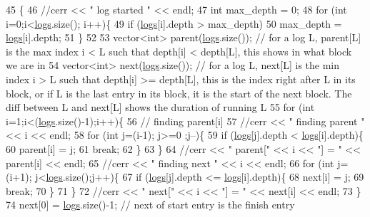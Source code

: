 \begin{DoxyCode}
45                 \{
46   \textcolor{comment}{//cerr << " log started " << endl;}
47   \textcolor{keywordtype}{int} max\_depth = 0;
48   \textcolor{keywordflow}{for} (\textcolor{keywordtype}{int} i=0;i<\hyperlink{classlogger_a46e89697a97bc41a90ec78763bfe4d39}{logs}.size(); i++)\{
49     \textcolor{keywordflow}{if} (\hyperlink{classlogger_a46e89697a97bc41a90ec78763bfe4d39}{logs}[i].depth > max\_depth)
50       max\_depth = \hyperlink{classlogger_a46e89697a97bc41a90ec78763bfe4d39}{logs}[i].depth;
51   \}
52 
53   vector<int> parent(\hyperlink{classlogger_a46e89697a97bc41a90ec78763bfe4d39}{logs}.size()); \textcolor{comment}{// for a log L, parent[L] is the max index i < L such that depth[i]
       < depth[L], this shows in what block we are in}
54   vector<int> next(\hyperlink{classlogger_a46e89697a97bc41a90ec78763bfe4d39}{logs}.size()); \textcolor{comment}{// for a log L, next[L] is the min index i > L such that depth[i] >=
       depth[L], this is the index right after L in its block, or if L is the last entry in its block, it is the
       start of the next block. The diff between L and next[L] shows the duration of running L}
55   \textcolor{keywordflow}{for} (\textcolor{keywordtype}{int} i=1;i<(\hyperlink{classlogger_a46e89697a97bc41a90ec78763bfe4d39}{logs}.size()-1);i++)\{
56     \textcolor{comment}{// finding parent[i]}
57     \textcolor{comment}{//cerr << " finding parent " << i << endl;}
58     \textcolor{keywordflow}{for} (\textcolor{keywordtype}{int} j=(i-1); j>=0 ;j--)\{
59       \textcolor{keywordflow}{if} (\hyperlink{classlogger_a46e89697a97bc41a90ec78763bfe4d39}{logs}[j].depth < \hyperlink{classlogger_a46e89697a97bc41a90ec78763bfe4d39}{logs}[i].depth)\{
60         parent[i] = j;
61         \textcolor{keywordflow}{break};
62       \}
63     \}
64     \textcolor{comment}{//cerr << " parent[" << i << "] = " << parent[i] << endl;}
65     \textcolor{comment}{//cerr << " finding next " << i << endl;}
66     \textcolor{keywordflow}{for} (\textcolor{keywordtype}{int} j=(i+1); j<\hyperlink{classlogger_a46e89697a97bc41a90ec78763bfe4d39}{logs}.size();j++)\{
67       \textcolor{keywordflow}{if} (\hyperlink{classlogger_a46e89697a97bc41a90ec78763bfe4d39}{logs}[j].depth <= \hyperlink{classlogger_a46e89697a97bc41a90ec78763bfe4d39}{logs}[i].depth)\{
68         next[i] = j;
69         \textcolor{keywordflow}{break};
70       \}
71     \}
72     \textcolor{comment}{//cerr << " next[" << i << "] = " << next[i] << endl;}
73   \}
74   next[0] = \hyperlink{classlogger_a46e89697a97bc41a90ec78763bfe4d39}{logs}.size()-1; \textcolor{comment}{// next of start entry is the finish entry}

\end{DoxyCode}
